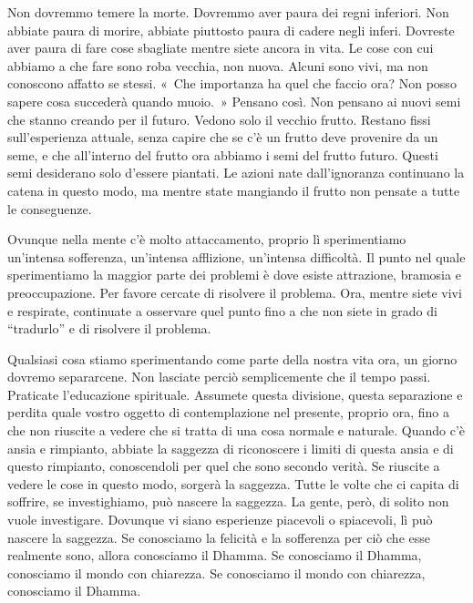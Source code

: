 Non dovremmo temere la morte. Dovremmo aver paura dei regni inferiori.
Non abbiate paura di morire, abbiate piuttosto paura di cadere negli
inferi. Dovreste aver paura di fare cose sbagliate mentre siete ancora
in vita. Le cose con cui abbiamo a che fare sono roba vecchia, non
nuova. Alcuni sono vivi, ma non conoscono affatto se stessi. «~Che
importanza ha quel che faccio ora? Non posso sapere cosa succederà
quando muoio.~» Pensano così. Non pensano ai nuovi semi che stanno
creando per il futuro. Vedono solo il vecchio frutto. Restano fissi
sull'esperienza attuale, senza capire che se c'è un frutto deve
provenire da un seme, e che all'interno del frutto ora abbiamo i semi
del frutto futuro. Questi semi desiderano solo d'essere piantati. Le
azioni nate dall'ignoranza continuano la catena in questo modo, ma
mentre state mangiando il frutto non pensate a tutte le conseguenze.

Ovunque nella mente c'è molto attaccamento, proprio lì sperimentiamo
un'intensa sofferenza, un'intensa afflizione, un'intensa difficoltà. Il
punto nel quale sperimentiamo la maggior parte dei problemi è dove
esiste attrazione, bramosia e preoccupazione. Per favore cercate di
risolvere il problema. Ora, mentre siete vivi e respirate, continuate a
osservare quel punto fino a che non siete in grado di ``tradurlo'' e di
risolvere il problema.

Qualsiasi cosa stiamo sperimentando come parte della nostra vita ora, un
giorno dovremo separarcene. Non lasciate perciò semplicemente che il
tempo passi. Praticate l'educazione spirituale. Assumete questa
divisione, questa separazione e perdita quale vostro oggetto di
contemplazione nel presente, proprio ora, fino a che non riuscite a
vedere che si tratta di una cosa normale e naturale. Quando c'è ansia e
rimpianto, abbiate la saggezza di riconoscere i limiti di questa ansia e
di questo rimpianto, conoscendoli per quel che sono secondo verità. Se
riuscite a vedere le cose in questo modo, sorgerà la saggezza. Tutte le
volte che ci capita di soffrire, se investighiamo, può nascere la
saggezza. La gente, però, di solito non vuole investigare. Dovunque vi
siano esperienze piacevoli o spiacevoli, lì può nascere la saggezza. Se
conosciamo la felicità e la sofferenza per ciò che esse realmente sono,
allora conosciamo il Dhamma. Se conosciamo il Dhamma, conosciamo il
mondo con chiarezza. Se conosciamo il mondo con chiarezza, conosciamo il
Dhamma.

